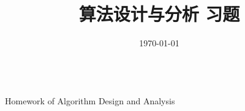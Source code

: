 \documentclass{main}
\title{{\Huge{\textbf{算法设计与分析 习题}}}}
\author{\defaultauthor}
\date{\today}
\begin{document}
\makeatletter
\newpage
\begin{titlepage}
    \centering
    \vfill
    {\@title \\[1cm]}  %
    {\Large Homework of Algorithm Design and Analysis \\[2cm]}  %
    \vfill  %
    {\Large\textit{\@author}} \\  %
    {\large \@date}  %
\end{titlepage}

\setcounter{page}{1}


\newpage
{}
\setcounter{page}{1}
\tableofcontents
\newpage
\setcounter{page}{1}



\end{document}
